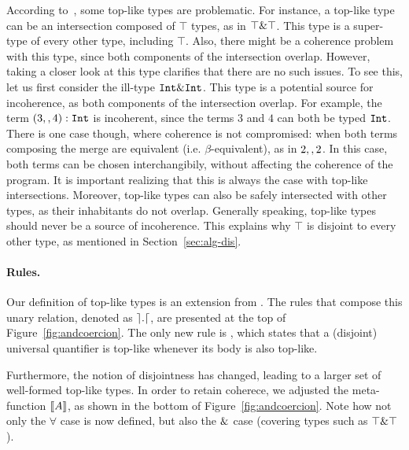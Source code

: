 According to~\cite{oliveira16disjoint}, some top-like types are problematic.
For instance, a top-like type can be an intersection composed of $\top$ types, as in
$\top \& \top$.
This type is a super-type of every other type, including $\top$.
Also, there might be a coherence problem with this type, since both components of the
intersection overlap.
However, taking a closer look at this type clarifies that there are no such issues. 
To see this, let us first consider the ill-type $\texttt{Int} \& \texttt{Int}$.
This type is a potential source for incoherence, as both components of the intersection 
overlap.
For example, the term $(3 ,, 4) : \texttt{Int}$ is incoherent, since 
the terms $3$ and $4$ can both be typed $\texttt{Int}$. 
There is one case though, where coherence is not compromised:
when both terms composing the merge are equivalent (i.e. $\beta$-equivalent), as in $2 ,, 2$.
In this case, both terms can be chosen interchangibily, without affecting the coherence
of the program.
It is important realizing that this is always the case with top-like intersections.
Moreover, top-like types can also be safely intersected with other types, as their inhabitants
do not overlap.
Generally speaking, top-like types should never be a source of incoherence. 
This explains why $\top$ is disjoint to every other type, as mentioned in Section~\ref{sec:alg-dis}.

\paragraph{Rules.}
Our definition of top-like types is an extension from \oldname. 
The rules that compose this unary relation, denoted as $\rceil  .  \lceil$, are presented at the top of 
Figure~\ref{fig:andcoercion}. 
The only new rule is , which states that a (disjoint) universal quantifier 
is top-like whenever its body is also top-like.

Furthermore, the notion of disjointness has changed, leading to a larger set of well-formed top-like types.
In order to retain coherece, we adjusted the meta-function $\llbracket A \rrbracket$, as shown in the bottom of 
Figure~\ref{fig:andcoercion}.
Note how not only the $\forall$ case is now defined, but also the $\&$ case (covering types such
as $\top \& \top$).


